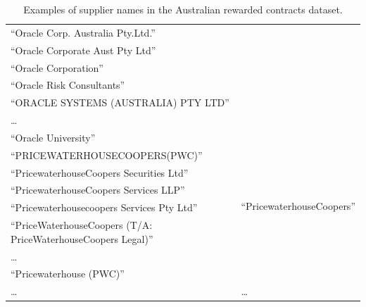 \documentclass{llncs}
\begin{document}
\begin{table}[!htb]
\begin{center}
\begin{tabular}{|p{7cm}|p{7cm}|}
  ``Oracle Corp. Australia Pty.Ltd.'' & \\
  ``Oracle Corporate Aust Pty Ltd'' & \\
  ``Oracle Corporation'' & \\
  ``Oracle Risk Consultants'' & \\
  ``ORACLE SYSTEMS (AUSTRALIA) PTY LTD'' & \\
  \ldots  & \\
  ``Oracle University''  & \\ \hline
  ``PRICEWATERHOUSECOOPERS(PWC)''  & \multirow{6}{*}{``PricewaterhouseCoopers''} \\
  ``PricewaterhouseCoopers Securities Ltd''& \multirow{6}{*}{\scriptsize\url{http://dbpedia.org/resource/PricewaterhouseCoopers}} \\
  ``PricewaterhouseCoopers Services LLP'' & \\
  ``Pricewaterhousecoopers Services Pty Ltd'' & \\
  ``PriceWaterhouseCoopers (T/A: PriceWaterhouseCoopers Legal)'' & \\
  \ldots  & \\
  ``Pricewaterhouse (PWC)'' & \\ \hline
  \ldots & \ldots \\
  \hline
  \end{tabular}
  \caption{Examples of supplier names in the Australian rewarded contracts dataset.}
  \label{tabla:aus-suppliers}
  \end{center}
\end{table} 
\end{document}
